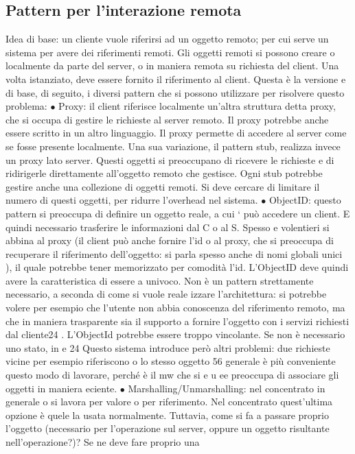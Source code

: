 \documentclass[a4paper,12pt]{article}
\begin{document}
\subsection{Pattern per l'interazione remota}
Idea di base: un cliente vuole riferirsi ad un oggetto remoto; per cui serve un
sistema per avere dei riferimenti remoti. Gli oggetti remoti si possono creare o
localmente da parte del server, o in maniera remota su richiesta del client. Una
volta istanziato, deve essere fornito il riferimento al client. Questa è la versione
e
di base, di seguito, i diversi pattern che si possono utilizzare per risolvere questo
problema:
$\bullet$ Proxy: il client riferisce localmente un'altra struttura detta proxy, che si
occupa di gestire le richieste al server remoto. Il proxy potrebbe anche
essere scritto in un altro linguaggio. Il proxy permette di accedere al server
come se fosse presente localmente.
Una sua variazione, il pattern stub, realizza invece un proxy lato server.
Questi oggetti si preoccupano di ricevere le richieste e di ridirigerle direttamente all'oggetto remoto che gestisce.
Ogni stub potrebbe gestire anche
una collezione di oggetti remoti.
Si deve cercare di limitare il numero di questi oggetti, per ridurre l'overhead nel sistema.
$\bullet$ ObjectID: questo pattern si preoccupa di definire un oggetto reale, a cui
`
può accedere un client. E quindi necessario trasferire le informazioni dal C
o
al S. Spesso e volentieri si abbina al proxy (il client può anche fornire l'id
o
al proxy, che si preoccupa di recuperare il riferimento dell'oggetto: si parla
spesso anche di nomi globali unici ), il quale potrebbe tener memorizzato
per comodità l'id. L'ObjectID deve quindi avere la caratteristica di essere
a
univoco.
Non è un pattern strettamente necessario, a seconda di come si vuole reale
izzare l'architettura: si potrebbe volere per esempio che l'utente non abbia
conoscenza del riferimento remoto, ma che in maniera trasparente sia il
supporto a fornire l'oggetto con i servizi richiesti dal cliente24 . L'ObjectId potrebbe essere troppo vincolante. Se
non è necessario uno stato, in
e
24 Questo sistema introduce però altri problemi: due richieste vicine per esempio riferiscono
o
lo stesso oggetto
56
generale è più conveniente questo modo di lavorare, perché è il mw che si
e u
ee
preoccupa di associare gli oggetti in maniera eciente.
$\bullet$ Marshalling/Unmarshalling: nel concentrato in generale o si lavora per
valore o per riferimento. Nel concentrato quest'ultima opzione è quele
la usata normalmente. Tuttavia, come si fa a passare proprio l'oggetto
(necessario per l'operazione sul server, oppure un oggetto risultante nell'operazione?)? Se ne deve fare proprio una
\end{document}
